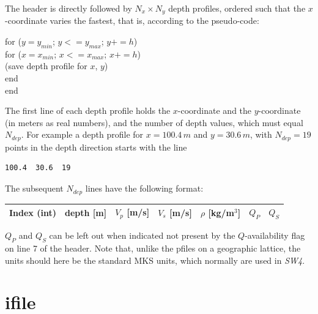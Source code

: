 \documentclass[11pt]{report}
\begin{document}
The header is directly followed by $N_{x}\times N_{y}$ depth profiles, ordered such that the $x$-coordinate
varies the fastest, that is, according to the pseudo-code:
\begin{flushleft}
\hspace{10mm}  for ($y= y_{min}$; $y <= y_{max}$; $y += h$)\\
\hspace{20mm}    for ($x= x_{min}$; $x <= x_{max}$; $x += h$)\\
\hspace{30mm}      (save depth profile for $x$, $y$)\\
\hspace{20mm}    end\\
\hspace{10mm}  end
\end{flushleft}
The first line of each depth profile holds the $x$-coordinate and the $y$-coordinate (in meters as real
numbers), and the number of depth values, which must equal $N_{dep}$. For example a depth profile
for $x=100.4\,m$ and $y=30.6\,m$, with $N_{dep}=19$ points in the depth direction starts with the line
\begin{verbatim}
100.4  30.6  19
\end{verbatim}
The subsequent $N_{dep}$ lines have the following format:
\begin{center}
\begin{tabular}{lllllll}\hline
Index (int)& depth [m] & $V_p$ [m/s] &  $V_s$ [m/s] & $\rho$ [kg/m$^3$] & $Q_P$ & $Q_S$ \\ \hline
\end{tabular}
\end{center}
$Q_P$ and $Q_S$ can be left out when indicated not present by the $Q$-availability flag on line 7 of
the header.  Note that, unlike the pfiles on a geographic lattice, the units should here be
the standard MKS units, which normally are used in \emph{SW4}.

\section{ifile}\label{sec:ifile-format}
\end{document}
